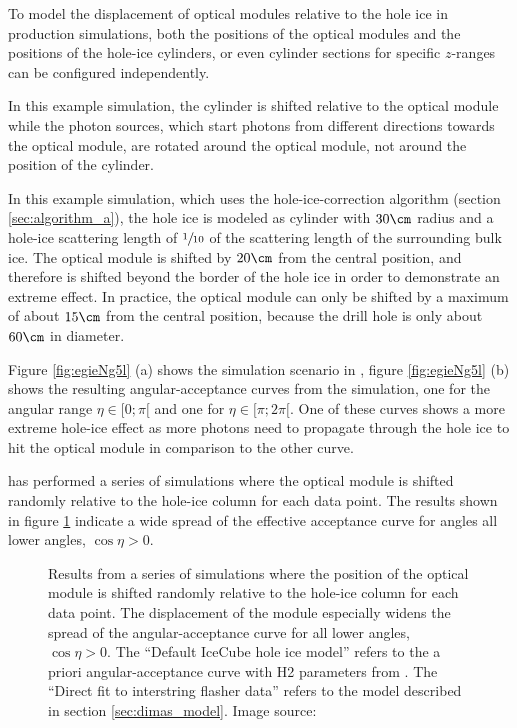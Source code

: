 To model the displacement of optical modules relative to the hole ice in production simulations, both the positions of the optical modules and the positions of the hole-ice cylinders, or even cylinder sections for specific $z$-ranges can be configured independently.

In this example simulation, the cylinder is shifted relative to the optical module while the photon sources, which start photons from different directions towards the optical module, are rotated around the optical module, not around the position of the cylinder.


In this example simulation, which uses the hole-ice-correction algorithm (section \ref{sec:algorithm_a}), the hole ice is modeled as cylinder with $30\cm$ radius and a hole-ice scattering length of $\sfrac{1}{10}$ of the scattering length of the surrounding bulk ice. The optical module is shifted by $20\cm$ from the central position, and therefore is shifted beyond the border of the hole ice in order to demonstrate an extreme effect. In practice, the optical module can only be shifted by a maximum of about $15\cm$ from the central position, because the drill hole is only about $60\cm$ in diameter.

Figure \ref{fig:egieNg5l} (a) shows the simulation scenario in \steamshovel, figure \ref{fig:egieNg5l} (b) shows the resulting angular-acceptance curves from the simulation, one for the angular range $\eta \in [0;\pi[$ and one for $\eta \in [\pi; 2\pi[$. One of these curves shows a more extreme hole-ice effect as more photons need to propagate through the hole ice to hit the optical module in comparison to the other curve.

\rongen has performed a series of simulations where the optical module is shifted randomly relative to the hole-ice column for each data point. The results shown in figure \ref{fig:zao5Mah0} indicate a wide spread of the effective acceptance curve for angles all lower angles, $\cos \eta > 0$. \cite{icrc17pocam}

\begin{figure}[htbp]
  \caption{Results from a series of simulations where the position of the optical module is shifted randomly relative to the hole-ice column for each data point. The displacement of the module especially widens the spread of the angular-acceptance curve for all lower angles, $\cos \eta > 0$. The \enquote{Default IceCube hole ice model} refers to the a priori angular-acceptance curve with H2 parameters from \cite{icepaper}. The \enquote{Direct fit to interstring flasher data} refers to the model described in section \ref{sec:dimas_model}. Image source: \cite{icrc17pocam}}
  \label{fig:zao5Mah0}
\end{figure}
